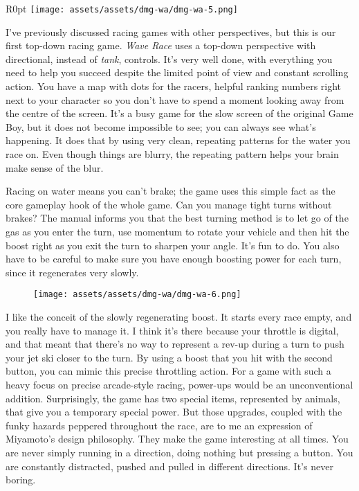 \documentclass{book}
\begin{document}
\begin{wrapfigure}{R}{0pt} \texttt{[image: assets/assets/dmg-wa/dmg-wa-5.png]}\end{wrapfigure}
I’ve previously discussed racing games with other perspectives, but this is our first top-down racing game. \emph{Wave Race} uses a top-down perspective with directional, instead of \emph{tank}, controls. It’s very well done, with everything you need to help you succeed despite the limited point of view and constant scrolling action. You have a map with dots for the racers, helpful ranking numbers right next to your character so you don’t have to spend a moment looking away from the centre of the screen. It’s a busy game for the slow screen of the original Game Boy, but it does not become impossible to see; you can always see what’s happening. It does that by using very clean, repeating patterns for the water you race on. Even though things are blurry, the repeating pattern helps your brain make sense of the blur.

Racing on water means you can’t brake; the game uses this simple fact as the core gameplay hook of the whole game. Can you manage tight turns without brakes? The manual informs you that the best turning method is to let go of the gas as you enter the turn, use momentum to rotate your vehicle and then hit the boost right as you exit the turn to sharpen your angle. It’s fun to do. You also have to be careful to make sure you have enough boosting power for each turn, since it regenerates very slowly.

\begin{figure}[hbt]
\vskip 10pt
\centering \texttt{[image: assets/assets/dmg-wa/dmg-wa-6.png]}
\vskip 6pt
\end{figure}

I like the conceit of the slowly regenerating boost. It starts every race empty, and you really have to manage it. I think it’s there because your throttle is digital, and that meant that there’s no way to represent a rev-up during a turn to push your jet ski closer to the turn. By using a boost that you hit with the second button, you can mimic this precise throttling action. For a game with such a heavy focus on precise arcade-style racing, power-ups would be an unconventional addition. Surprisingly, the game has two special items, represented by animals, that give you a temporary special power. But those upgrades, coupled with the funky hazards peppered throughout the race, are to me an expression of Miyamoto’s design philosophy. They make the game interesting at all times. You are never simply running in a direction, doing nothing but pressing a button. You are constantly distracted, pushed and pulled in different directions. It’s never boring.
\end{document}
